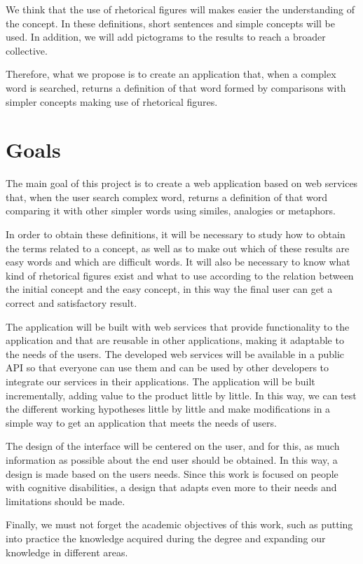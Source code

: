 We think that the use of rhetorical figures will makes easier the understanding of the concept. In these definitions, short sentences and simple concepts will be used.
In addition, we will add pictograms to the results to reach a broader collective.

Therefore, what we propose is to create an application that, when a complex word is searched, returns a definition of that word formed by comparisons with simpler concepts making use of rhetorical figures.


\section{Goals}
\label{sec:goals}

The main goal of this project is to create a web application based on web services that, when the user search complex word, returns a definition of that word comparing it with other simpler words using similes, analogies or metaphors.

In order to obtain these definitions, it will be necessary to study how to obtain the terms related to a concept, as well as to make out which of these results are easy words and which are difficult words.
It will also be necessary to know what kind of rhetorical figures exist and what to use according to the relation between the initial concept and the easy concept, in this way the final user can get a correct and satisfactory result.

The application will be built with web services that provide functionality to the application and that are reusable in other applications, making it adaptable to the needs of the users.
The developed web services will be available in a public API so that everyone can use them and can be used by other developers to integrate our services in their applications.
The application will be built incrementally, adding value to the product little by little. In this way, we can test the different working hypotheses little by little and make modifications in a simple way to get an application that meets the needs of users.

The design of the interface will be centered on the user, and for this, as much information as possible about the end user should be obtained. In this way, a design is made based on the users needs.
Since this work is focused on people with cognitive disabilities, a design that adapts even more to their needs and limitations should be made.

Finally, we must not forget the academic objectives of this work, such as putting into practice the knowledge acquired during the degree and expanding our knowledge in different areas.

